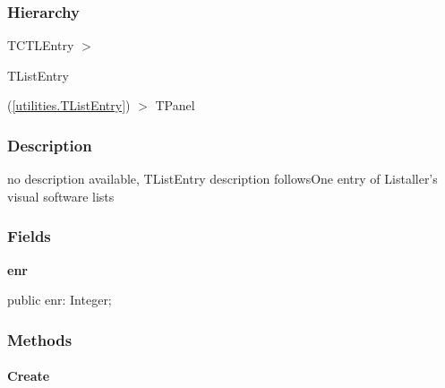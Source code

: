 \documentclass{report}
\newif\ifpdf
\begin{document}
\subsubsection*{\large{\textbf{Hierarchy}}\normalsize\hspace{1ex}\hfill}
TCTLEntry {$>$} \begin{ttfamily}TListEntry\end{ttfamily}(\ref{utilities.TListEntry}) {$>$} 
TPanel
\subsubsection*{\large{\textbf{Description}}\normalsize\hspace{1ex}\hfill}
no description available, TListEntry description followsOne entry of Listaller's visual software lists\subsubsection*{\large{\textbf{Fields}}\normalsize\hspace{1ex}\hfill}
\begin{list}{}{
\setlength{\itemindent}{0cm}
\setlength{\listparindent}{0cm}
\setlength{\leftmargin}{\evensidemargin}
\addtolength{\leftmargin}{\tmplength}
\settowidth{\labelsep}{X}
\addtolength{\leftmargin}{\labelsep}
\setlength{\labelwidth}{\tmplength}
}
\label{swcatalog.TCTLEntry-enr}
\item[\textbf{enr}\hfill]
\ifpdf
\begin{flushleft}
\fi
\begin{ttfamily}
public enr: Integer;\end{ttfamily}

\ifpdf
\end{flushleft}
\fi


\par  \end{list}
\subsubsection*{\large{\textbf{Methods}}\normalsize\hspace{1ex}\hfill}
\paragraph*{Create}\hspace*{\fill}
\end{document}
